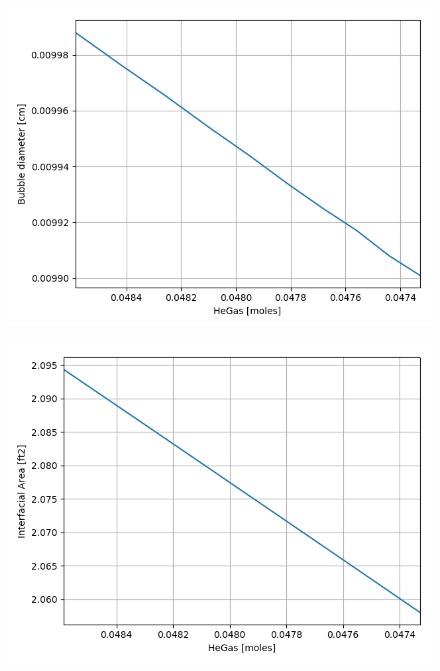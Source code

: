 \begin{figure}[p] 
\centering
\begin{minipage}{.5\textwidth}
  \centering
  \includegraphics[width=.9\linewidth]{images/BubbleDiaMassDecrease.png}
  \label{fig:mass_decrease_bubDia}
\end{minipage}%
\begin{minipage}{.5\textwidth}
  \centering
  \includegraphics[width=.9\linewidth]{images/IntAreaMassDecrease.png}
  \label{fig:mass_decrease_intArea}
\end{minipage}
\end{figure}

\FloatBarrier
\newpage
\FloatBarrier



